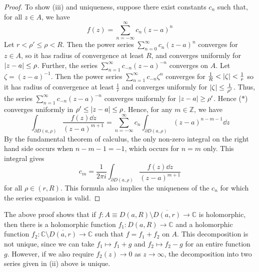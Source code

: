 \begin{proof}
	To show (iii) and uniqueness, suppose there exist constants \( c_n \) such that, for all \( z \in A \), we have
	\begin{equation}
		f(z) = \sum_{n=-\infty}^\infty c_n (z-a)^n \tag{\(\ast\)}
	\end{equation}
	Let \( r < \rho' \leq \rho < R \).
	Then the power series \( \sum_{n=0}^\infty c_n (z-a)^n \) converges for \( z \in A \), so it has radius of convergence at least \( R \), and converges uniformly for \( \abs{z-a} \leq \rho \).
	Further, the series \( \sum_{n=1}^\infty c_{-n} (z-a)^{-n} \) converges on \( A \).
	Let \( \zeta = (z-a)^{-1} \).
	Then the power series \( \sum_{n=1}^\infty c_{-n} \zeta^n \) converges for \( \frac{1}{R} < \abs{\zeta} < \frac{1}{r} \) so it has radius of convergence at least \( \frac{1}{r} \) and converges uniformly for \( \abs{\zeta} \leq \frac{1}{\rho'} \).
	Thus, the series \( \sum_{n=1}^\infty c_{-n} (z-a)^{-n} \) converges uniformly for \( \abs{z-a} \geq \rho' \).
	Hence (\(\ast\)) converges uniformly in \( \rho' \leq \abs{z-a} \leq \rho \).
	Hence, for any \( m \in \mathbb Z \), we have
	\[ \int_{\partial D(a,\rho)} \frac{f(z) \dd{z}}{(z-a)^{m+1}} = \sum_{n=-\infty}^\infty c_n \int_{\partial D(a,\rho)} (z-a)^{n-m-1} \dd{z} \]
	By the fundamental theorem of calculus, the only non-zero integral on the right hand side occurs when \( n - m - 1 = -1 \), which occurs for \( n = m \) only.
	This integral gives
	\[ c_m = \frac{1}{2\pi i} \int_{\partial D(a,\rho)} \frac{f(z) \dd{z}}{(z-a)^{m+1}} \]
	for all \( \rho \in (r,R) \).
	This formula also implies the uniqueness of the \( c_n \) for which the series expansion is valid.
\end{proof}
\begin{remark}
	The above proof shows that if \( f \colon A \equiv D(a,R)\setminus \overline{D(a,r)} \to \mathbb C \) is holomorphic, then there is a holomorphic function \( f_1 \colon D(a,R) \to \mathbb C \) and a holomorphic function \( f_2 \colon \mathbb C \setminus \overline{D(a,r)} \to \mathbb C \) such that \( f = f_1 + f_2 \) on \( A \).
	This decomposition is not unique, since we can take \( f_1 \mapsto f_1 + g \) and \( f_2 \mapsto f_2 - g \) for an entire function \( g \).
	However, if we also require \( f_2(z) \to 0 \) as \( z \to \infty \), the decomposition into two series given in (ii) above is unique.
\end{remark}

